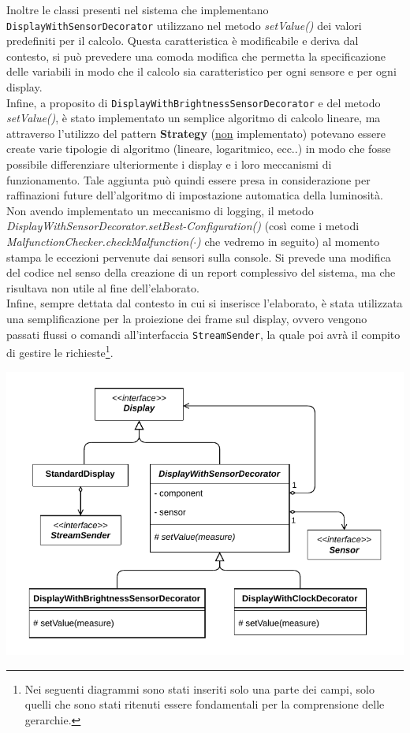 \documentclass[a4paper,11pt]{article}
\begin{document}
	Inoltre le classi presenti nel sistema che implementano \texttt{DisplayWithSensorDecorator} utilizzano nel metodo \textit{setValue()} dei valori predefiniti per il calcolo. Questa caratteristica è modificabile e deriva dal contesto, si può prevedere una comoda modifica che permetta la specificazione delle variabili in modo che il calcolo sia caratteristico per ogni sensore e per ogni display.\\
	Infine, a proposito di \texttt{DisplayWithBrightnessSensorDecorator} e del metodo \textit{setValue()}, è stato implementato un semplice algoritmo di calcolo lineare, ma attraverso l'utilizzo del pattern \textbf{Strategy} (\underline{non} implementato) potevano essere create varie tipologie di algoritmo (lineare, logaritmico, ecc..) in modo che fosse possibile differenziare ulteriormente i display e i loro meccanismi di funzionamento.
	Tale aggiunta può quindi essere presa in considerazione per raffinazioni future dell'algoritmo di impostazione automatica della luminosità.\\
	Non avendo implementato un meccanismo di logging, il metodo \textit{DisplayWithSensorDecorator.setBest-Configuration()} (così come i metodi \textit{MalfunctionChecker.checkMalfunction($\cdot$)} che vedremo in seguito) al momento stampa le eccezioni pervenute dai sensori sulla console. Si prevede una modifica del codice nel senso della creazione di un report complessivo del sistema, ma che risultava non utile al fine dell'elaborato.\\
	Infine, sempre dettata dal contesto in cui si inserisce l'elaborato, è stata utilizzata una semplificazione per la proiezione dei frame sul display, ovvero vengono passati flussi o comandi all'interfaccia \texttt{StreamSender}, la quale poi avrà il compito di gestire le richieste\footnote{Nei seguenti diagrammi sono stati inseriti solo una parte dei campi, solo quelli che sono stati ritenuti essere fondamentali per la comprensione delle gerarchie.}.\\
	\begin{minipage}[c]{\textwidth}
		\centering
		\includegraphics[width=.5\textwidth]{diagramma/ClassDiagramm-DisplayHierarchy.pdf}
		\label{fig:display}
	\end{minipage}	
	
\end{document}
